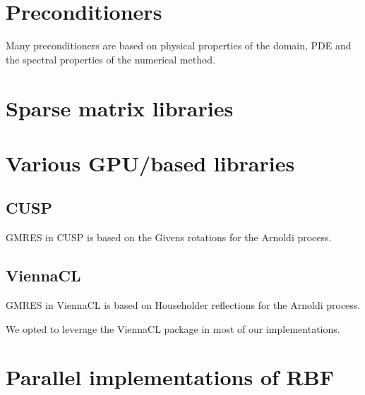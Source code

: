 \section{  Preconditioners }

Many preconditioners are based on physical properties of the domain, PDE and the spectral properties of the numerical method. 

\section{   Sparse matrix libraries }
\section{  Various GPU/based libraries }

\subsection{CUSP}

GMRES in CUSP is based on the Givens rotations for the Arnoldi process. 

\subsection{ViennaCL}

GMRES in ViennaCL is based on Householder reflections for the Arnoldi process. 

We opted to leverage the ViennaCL package in most of our implementations. 

\section{  Parallel implementations of RBF}

